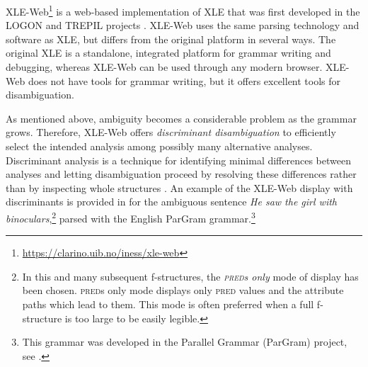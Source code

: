 \documentclass[output=paper,hidelinks]{langscibook}
\begin{document}




XLE-Web\footnote{\url{https://clarino.uib.no/iness/xle-web}} is a web-based implementation of XLE that was first developed in the LOGON and TREPIL projects \citep{rosenetalccorpus05,Rosen06}.
XLE-Web uses the same parsing technology and software as XLE, but differs from the original platform in several ways.
The original XLE is a standalone, integrated platform for grammar writing and debugging, whereas XLE-Web can be used through any modern browser.
XLE-Web does not have tools for grammar writing, but it offers excellent tools for disambiguation. %

As mentioned above, ambiguity becomes a considerable problem as the grammar grows.
Therefore, XLE-Web offers \textit{discriminant disambiguation} to efficiently select the intended analysis among possibly many alternative analyses.
Discriminant analysis is a technique for identifying minimal differences between analyses and letting disambiguation proceed by resolving these differences rather than by inspecting whole structures \citep{Rosen07lfg}.
An example of the XLE-Web display with discriminants is provided in  for the ambiguous sentence \textit{He saw the girl with binoculars},\footnote{In this and many subsequent f-structures, the \textit{\textsc{pred}s only} mode of display has been chosen. 
\textsc{pred}s only mode displays only \textsc{pred} values and the attribute paths which lead to them.
This mode is often preferred when a full f-structure is too large to be easily legible.} parsed with the English ParGram grammar.\footnote{This grammar was developed in the Parallel Grammar (ParGram) project, see .} %
\end{document}
